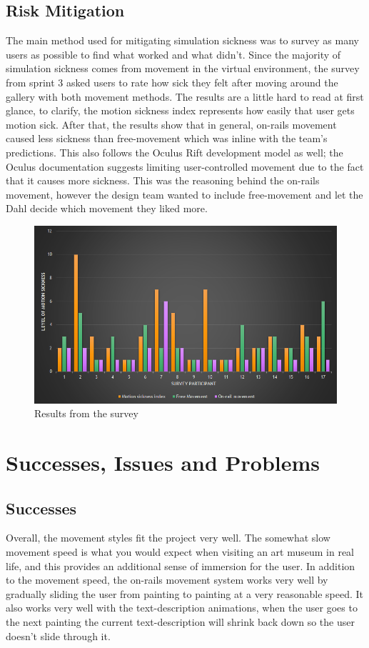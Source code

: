 \subsection{Risk Mitigation}
The main method used for mitigating simulation sickness was to survey as many users as possible to find what worked and what didn't.  Since the majority of simulation sickness comes from movement in the virtual environment, the survey from sprint 3 asked users to rate how sick they felt after moving around the gallery with both movement methods.  The results are a little hard to read at first glance, to clarify, the motion sickness index represents how easily that user gets motion sick.  After that, the results show that in general, on-rails movement caused less sickness than free-movement which was inline with the team's predictions.  This also follows the Oculus Rift development model as well; the Oculus documentation suggests limiting user-controlled movement due to the fact that it causes more sickness.  This was the reasoning behind the on-rails movement, however the design team wanted to include free-movement and let the Dahl decide which movement they liked more.
\begin{figure}
\centering
\includegraphics[scale=0.5]{Diagrams/surveyresults.png}
\caption{Results from the survey}
\end{figure}
\section{Successes, Issues and Problems}
\subsection{Successes}
Overall, the movement styles fit the project very well.  The somewhat slow movement speed is what you would expect when visiting an art museum in real life, and this provides an additional sense of immersion for the user.  In addition to the movement speed, the on-rails movement system works very well by gradually sliding the user from painting to painting at a very reasonable speed.  It also works very well with the text-description animations, when the user goes to the next painting the current text-description will shrink back down so the user doesn't slide through it. 

